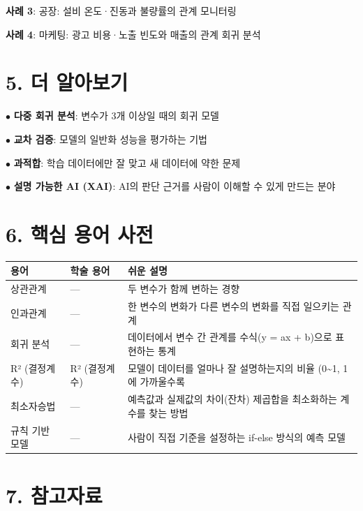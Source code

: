 \documentclass[11pt,a4paper]{article}
\begin{document}
\textbf{사례 3}: 공장: 설비 온도·진동과 불량률의 관계 모니터링


\textbf{사례 4}: 마케팅: 광고 비용·노출 빈도와 매출의 관계 회귀 분석



\section*{5. 더 알아보기}

$\bullet$ \textbf{다중 회귀 분석}: 변수가 3개 이상일 때의 회귀 모델

$\bullet$ \textbf{교차 검증}: 모델의 일반화 성능을 평가하는 기법

$\bullet$ \textbf{과적합}: 학습 데이터에만 잘 맞고 새 데이터에 약한 문제

$\bullet$ \textbf{설명 가능한 AI (XAI)}: AI의 판단 근거를 사람이 이해할 수 있게 만드는 분야



\section*{6. 핵심 용어 사전}

\begin{center}
\renewcommand{\arraystretch}{1.4}
\begin{tabular}{|p{2.3cm}|p{2.1cm}|p{10.6cm}|}
\hline
\rowcolor{tableheader}
\textbf{용어} & \textbf{학술 용어} & \textbf{쉬운 설명} \\
\hline
상관관계 & — & 두 변수가 함께 변하는 경향 \\
\hline
인과관계 & — & 한 변수의 변화가 다른 변수의 변화를 직접 일으키는 관계 \\
\hline
회귀 분석 & — & 데이터에서 변수 간 관계를 수식(y = ax + b)으로 표현하는 통계 \\
\hline
R² (결정계수) & R² (결정계수) & 모델이 데이터를 얼마나 잘 설명하는지의 비율 (0\textasciitilde{}1, 1에 가까울수록 \\
\hline
최소자승법 & — & 예측값과 실제값의 차이(잔차) 제곱합을 최소화하는 계수를 찾는 방법 \\
\hline
규칙 기반 모델 & — & 사람이 직접 기준을 설정하는 if-else 방식의 예측 모델 \\
\hline
\end{tabular}
\end{center}


\section*{7. 참고자료}
\end{document}
